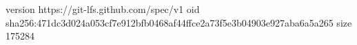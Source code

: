 version https://git-lfs.github.com/spec/v1
oid sha256:471dc3d024a053cf7e912bfb0468af44ffce2a73f5e3b04903e927aba6a5a265
size 175284
